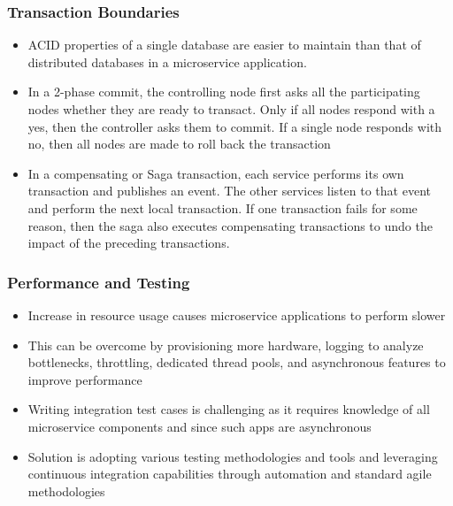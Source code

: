 \documentclass{article}
\begin{document}
\subsubsection{Transaction Boundaries}
\begin{itemize}
    \item ACID properties of a single database are easier to maintain than that of distributed databases in a microservice application. 
    
    \item In a 2-phase commit, the controlling node first asks all the participating nodes whether they are ready to transact. Only if all nodes respond with a yes, then the controller asks them to commit. If a single node responds with no, then all nodes are made to roll back the transaction
    
    \item In a compensating or Saga transaction, each service performs its own transaction and publishes an event. The other services listen to that event and perform the next local transaction. If one transaction fails for some reason, then the saga also executes compensating transactions to undo the impact of the preceding transactions.
\end{itemize}

\subsubsection{Performance and Testing}
\begin{itemize}
    \item Increase in resource usage causes microservice applications to perform slower
    
    \item This can be overcome by provisioning more hardware, logging to analyze bottlenecks, throttling, dedicated thread pools, and asynchronous features to improve performance
    
    \item Writing integration test cases is challenging as it requires knowledge of all microservice components and since such apps are asynchronous
    
    \item Solution is adopting various testing methodologies and tools and leveraging continuous integration capabilities through automation and standard agile methodologies
\end{itemize}
\end{document}
